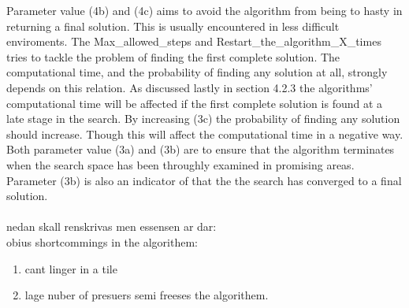 Parameter value (4b) and (4c) aims to avoid the algorithm from being to hasty in returning a final solution. This is usually encountered in less difficult enviroments. The Max\_allowed\_steps and Restart\_the\_algorithm\_X\_times tries to tackle the problem of finding the first complete solution. The computational time, and the probability of finding any solution at all, strongly depends on this relation. As discussed lastly in section 4.2.3 the algorithms' computational time will be affected if the first complete solution is found at a late stage in the search. By increasing (3c) the probability of finding any solution should increase. Though this will affect the computational time in a negative way. Both parameter value (3a) and (3b) are to ensure that the algorithm terminates when the search space has been throughly examined in promising areas.
Parameter (3b) is also an indicator of that the the search has converged to a final solution.\\
\\
nedan skall renskrivas men essensen ar dar:\\
obius shortcommings in the algorithem:
\begin{enumerate}
\item{} cant linger in a tile
\item{} lage nuber of presuers semi freeses the algorithem.
\end{enumerate} 


